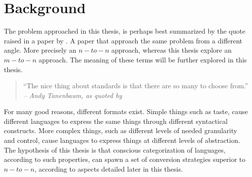 \documentclass{scrreprt}
\begin{document}
%
%
%
%
%
%


\tableofcontents
\pagebreak











%
%
%
%
%
%










%
%
%
%
%
%

\chapter{Background}
The problem approached in this thesis, is perhaps best summarized by the quote raised in a paper by \citet{krijnen}. A paper that approach the same problem from a different angle. More precisely an $n-to-n$ approach, whereas this thesis explore an $m-to-n$ approach. The meaning of these terms will be further explored in this thesis.

\begin{quote}
``The nice thing about standards is that there are so many to choose from.''\\
\textit{-- Andy Tanenbaum, as quoted by \citet{krijnen}}
\end{quote}

For many good reasons, different formats exist. Simple things such as taste, cause different languages to express the same things through different syntactical constructs. More complex things, such as different levels of needed granularity and control, cause languages to express things at different levels of abstraction. The hypothesis of this thesis is that conscious categorization of languages, according to such properties, can spawn a set of conversion strategies superior to $n-to-n$, according to aspects detailed later in this thesis.

\end{document}
